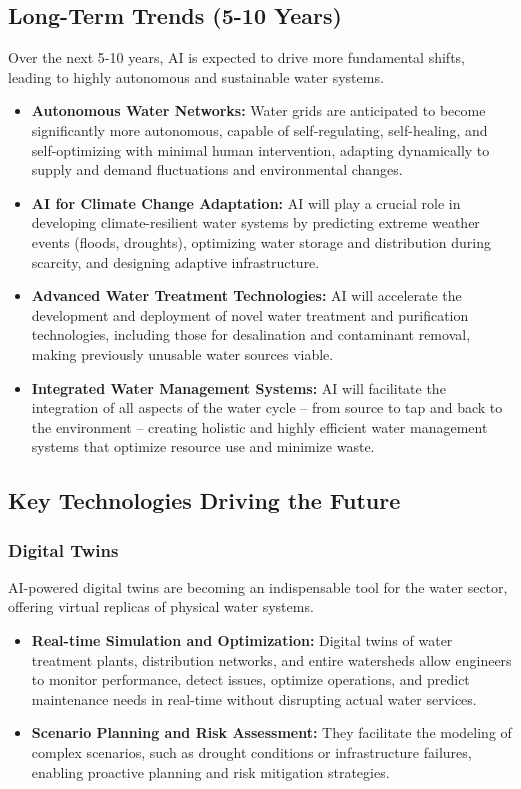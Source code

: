 \subsection{Long-Term Trends (5-10 Years)}
Over the next 5-10 years, AI is expected to drive more fundamental shifts, leading to highly autonomous and sustainable water systems.
\begin{itemize}
    \item \textbf{Autonomous Water Networks:} Water grids are anticipated to become significantly more autonomous, capable of self-regulating, self-healing, and self-optimizing with minimal human intervention, adapting dynamically to supply and demand fluctuations and environmental changes.
    \item \textbf{AI for Climate Change Adaptation:} AI will play a crucial role in developing climate-resilient water systems by predicting extreme weather events (floods, droughts), optimizing water storage and distribution during scarcity, and designing adaptive infrastructure.
    \item \textbf{Advanced Water Treatment Technologies:} AI will accelerate the development and deployment of novel water treatment and purification technologies, including those for desalination and contaminant removal, making previously unusable water sources viable.
    \item \textbf{Integrated Water Management Systems:} AI will facilitate the integration of all aspects of the water cycle – from source to tap and back to the environment – creating holistic and highly efficient water management systems that optimize resource use and minimize waste.
\end{itemize}

\subsection{Key Technologies Driving the Future}

\subsubsection{Digital Twins}
AI-powered digital twins are becoming an indispensable tool for the water sector, offering virtual replicas of physical water systems.
\begin{itemize}
    \item \textbf{Real-time Simulation and Optimization:} Digital twins of water treatment plants, distribution networks, and entire watersheds allow engineers to monitor performance, detect issues, optimize operations, and predict maintenance needs in real-time without disrupting actual water services.
    \item \textbf{Scenario Planning and Risk Assessment:} They facilitate the modeling of complex scenarios, such as drought conditions or infrastructure failures, enabling proactive planning and risk mitigation strategies.
\end{itemize}

